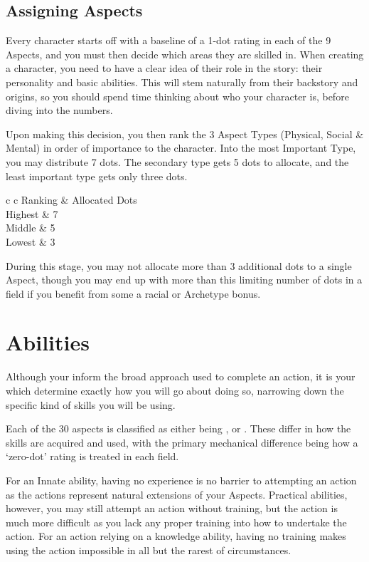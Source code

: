 \subsection{Assigning Aspects}

Every character starts off with a baseline of a 1-dot rating in each of the 9 Aspects, and you must then decide which areas they are skilled in. When creating a character, you need to have a clear idea of their role in the story: their personality and basic abilities. This will stem naturally from their backstory and origins, so you should spend time thinking about who your character is, before diving into the numbers. 

Upon making this decision, you then rank the 3 Aspect Types (Physical, Social \& Mental) in order of importance to the character. Into the most Important Type, you may distribute 7 dots. The secondary type gets 5 dots to allocate, and the least important type gets only three dots. 

\begin{center}
	\small
	\begin{rndtable}{c c}
	Ranking &  Allocated Dots \\
	Highest & 7
	\\
	Middle 	&	5
	\\
	Lowest & 3
	\end{rndtable}
\end{center}

During this stage, you may not allocate more than 3 additional dots to a single Aspect, though you may end up with more than this limiting number of dots in a field if you benefit from some a racial or Archetype bonus. 



\section{Abilities}

Although your  inform the broad approach used to complete an action, it is your  which determine exactly how you will go about doing so, narrowing down the specific kind of skills you will be using. 

Each of the 30 aspects is classified as either being ,  or . These differ in how the skills are acquired and used, with the primary mechanical difference being how a `zero-dot' rating is treated in each field. 

For an Innate ability, having no experience is no barrier to attempting an action as the actions represent natural extensions of your Aspects. Practical abilities, however, you may still attempt an action without training, but the action is much more difficult as you lack any proper training into how to undertake the action. For an action relying on a knowledge ability, having no training makes using the action impossible in all but the rarest of circumstances.

